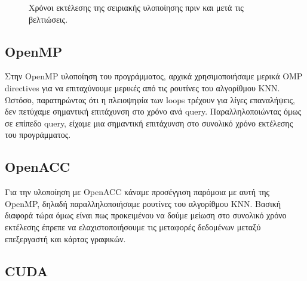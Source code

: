 \documentclass[11pt]{scrartcl} %
\begin{document}
\begin{figure}[H]
    \begin{center}
    \end{center}
    \caption{Χρόνοι εκτέλεσης της σειριακής υλοποίησης πριν και μετά τις βελτιώσεις.}
    \label{fig:before_after_times}
\end{figure}


\subsection{OpenMP}

Στην OpenMP υλοποίηση του προγράμματος, αρχικά χρησιμοποιήσαμε μερικά OMP directives
για να επιταχύνουμε μερικές από τις ρουτίνες του αλγορίθμου ΚΝΝ.
Ωστόσο, παρατηρώντας ότι η πλειοψηφία των loops τρέχουν για λίγες επαναλήψεις, δεν πετύχαμε σημαντική επιτάχυνση στο χρόνο ανά query.
Παραλληλοποιώντας όμως σε επίπεδο query, είχαμε μια σημαντική επιτάχυνση στο συνολικό χρόνο εκτέλεσης του προγράμματος.

\subsection{OpenACC}

Για την υλοποίηση με OpenACC κάναμε προσέγγιση παρόμοια με αυτή της OpenMP, δηλαδή
παραλληλοποιήσαμε ρουτίνες του αλγορίθμου KNN. 
Βασική διαφορά τώρα όμως είναι πως προκειμένου να δούμε μείωση στο συνολικό χρόνο εκτέλεσης έπρεπε 
να ελαχιστοποιήσουμε τις μεταφορές δεδομένων μεταξύ επεξεργαστή και κάρτας γραφικών.

\subsection{CUDA}
\end{document}
